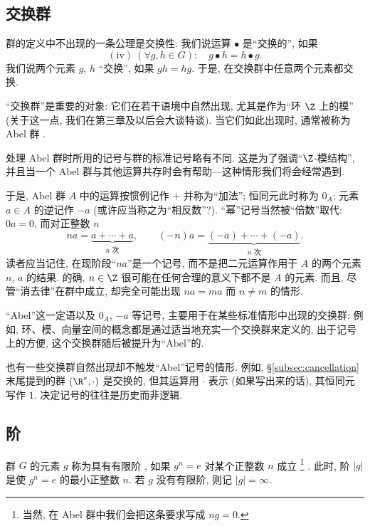 \subsection{交换群}
\label{subsec:commutative-groups}

群的定义中不出现的一条公理是交换性: 我们说运算 $\bullet$ 是``交换的'', 如果
\[
(\text{iv})\ (\forall g, h \in G): \quad g \bullet h = h \bullet g.
\]
我们说两个元素 $g$, $h$ ``交换'', 如果 $gh = hg$. 于是, 在交换群中任意两个元素都交换.

``交换群''是重要的对象: 它们在若干语境中自然出现, 尤其是作为``环 $\Z$ 上的模'' (关于这一点, 我们在第三章及以后会大谈特谈). 当它们如此出现时, 通常被称为 Abel 群%
.

处理 Abel 群时所用的记号与群的标准记号略有不同. 这是为了强调``$\Z$-模结构'', 并且当一个 Abel 群与其他运算共存时会有帮助---这种情形我们将会经常遇到.

于是, Abel 群 $A$ 中的运算按惯例记作 $+$ 并称为``加法''; 恒同元此时称为 $0_A$; 元素 $a \in A$ 的逆记作 $-a$ (或许应当称之为``相反数''?). ``幂''记号当然被``倍数''取代: $0a = 0$, 而对正整数 $n$
\[
na = \underbrace{a + \cdots + a}_{n \text{ 次}}, \qquad (-n)a = \underbrace{(-a) + \cdots + (-a)}_{n \text{ 次}}.\]
读者应当记住, 在现阶段``$na$''是一个记号, 而不是把二元运算作用于 $A$ 的两个元素 $n$, $a$ 的结果. 的确, $n \in \Z$ 很可能在任何合理的意义下都不是 $A$ 的元素. 而且, 尽管``消去律''在群中成立, 却完全可能出现 $na = ma$ 而 $n \neq m$ 的情形.

``Abel''这一定语以及 $0_A$, $-a$ 等记号, 主要用于在某些标准情形中出现的交换群: 例如, 环、模、向量空间的概念都是通过适当地充实一个交换群来定义的, 出于记号上的方便, 这个交换群随后被提升为``Abel''的.

也有一些交换群自然出现却不触发``Abel''记号的情形. 例如, \S\ref{subsec:cancellation} 末尾提到的群 $(\R^{*}, \cdot)$ 是交换的, 但其运算用 $\cdot$ 表示 (如果写出来的话), 其恒同元写作 $1$. 决定记号的往往是历史而非逻辑.

\subsection{阶}
\label{subsec:order}

\begin{definition}
\label{def:order-element}
群 $G$ 的元素 $g$ 称为具有有限阶%
, 如果 $g^n = e$ 对某个正整数 $n$ 成立%
\footnote{当然, 在 Abel 群中我们会把这条要求写成 $ng = 0$.}%
. 此时, 阶 $|g|$ 是使 $g^n = e$ 的最小正整数 $n$. 若 $g$ 没有有限阶, 则记 $|g| = \infty$.
\end{definition}

